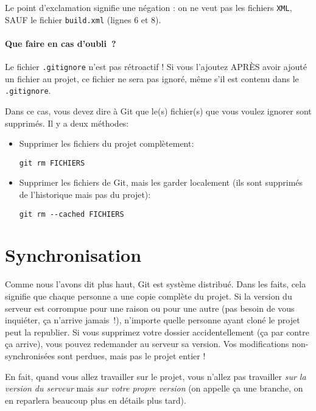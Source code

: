 \documentclass[10pt,a4paper]{article}
\begin{document}
Le point d'exclamation signifie une négation : on ne veut pas les fichiers {\tt XML}, SAUF le fichier {\tt build.xml} (lignes 6 et 8).

\paragraph{Que faire en cas d'oubli~?\label{oubli-gitiginore}}

Le fichier {\tt .gitignore} n'est pas rétroactif ! Si vous l'ajoutez APRÈS avoir ajouté un fichier au projet, ce fichier ne sera pas ignoré, même s'il est contenu dans le {\tt .gitignore}.

Dans ce cas, vous devez dire à Git que le(s) fichier(s) que vous voulez ignorer sont supprimés. Il y a deux méthodes:

\begin{itemize}
\item Supprimer les fichiers du projet complètement:%

\begin{verbatim}
git rm FICHIERS
\end{verbatim}

\item Supprimer les fichiers de Git, mais les garder localement (ils sont supprimés de l'historique mais pas du projet):%

\begin{verbatim}
git rm --cached FICHIERS
\end{verbatim}
\end{itemize}

\section{Synchronisation}

Comme nous l'avons dit plus haut, Git est système distribué. Dans les faits, cela signifie que chaque personne a une copie complète du projet. Si la version du serveur est corrompue pour une raison ou pour une autre (pas besoin de vous inquiéter, ça n'arrive jamais~!), n'importe quelle personne ayant cloné le projet peut la republier. Si vous supprimez votre dossier accidentellement (ça par contre ça arrive), vous pouvez redemander au serveur sa version. Vos modifications non-synchronisées sont perdues, mais pas le projet entier !

En fait, quand vous allez travailler sur le projet, vous n'allez pas travailler \textit{sur la version du serveur} mais \textit{sur votre propre version} (on appelle ça une branche, on en reparlera beaucoup plus en détails plus tard).
\end{document}
